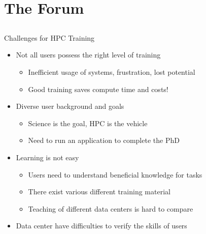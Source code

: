 \documentclass[compress,aspectratio=169]{beamer}
\begin{document}
\section{The Forum}
\sectionIntroHidden

\subsection{}


\begin{frame}{Challenges for HPC Training}
		\begin{itemize}
			\item Not all users possess the right level of training
				\begin{itemize}
				\item Inefficient usage of systems, frustration, lost potential
				\item Good training saves compute time and costs!
				\end{itemize}
      \item Diverse user background and goals
        \begin{itemize}
          \item Science is the goal, HPC is the vehicle
          \item Need to run an application to complete the PhD
        \end{itemize}
      \item Learning is not easy
			\begin{itemize}
				\item Users need to understand beneficial knowledge for tasks
				\item There exist various different training material
				\item Teaching of different data centers is hard to compare
			\end{itemize}
			\item Data center have difficulties to verify the skills of users
		\end{itemize}

\end{frame}
\end{document}
